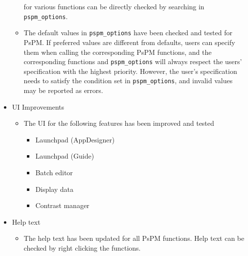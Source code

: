 \documentclass[english]{article}
\numberwithin{equation}{section}
\numberwithin{figure}{section}
\begin{document}
\begin{itemize}
\begin{itemize}
						for various functions can be directly checked by searching in \texttt{pspm\_options}.
			\item The default values in \texttt{pspm\_options} have been checked and tested for 
						PsPM. If preferred values are different from defaults, users can specify them 
						when calling the corresponding PsPM functions, and the corresponding functions 
						and \texttt{pspm\_options} will always respect the users' specification with 
						the highest priority. However, the user's specification needs to satisfy the 
						condition set in \texttt{pspm\_options}, and invalid values may be reported 
						as errors.
		\end{itemize}
		\item UI Improvements
		\begin{itemize}
			\item The UI for the following features has been improved and tested
			\begin{itemize}
				\item Launchpad (AppDesigner)
				\item Launchpad (Guide)
				\item Batch editor
				\item Display data
				\item Contrast manager
			\end{itemize}
		\end{itemize}
		\item Help text
		\begin{itemize}
			\item The help text has been updated for all PsPM functions. Help text can be 
						checked by right clicking the functions.
		\end{itemize}
	\end{itemize}
\end{document}
